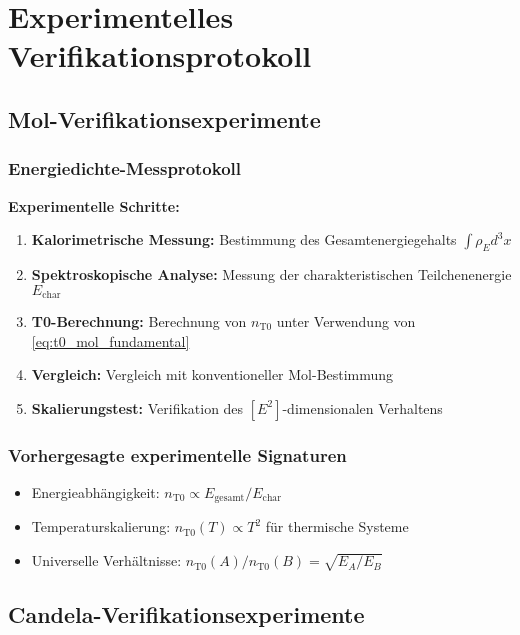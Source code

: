 \documentclass[12pt,a4paper]{article}
\newcommand{\rhoE}{\rho_E}
\newcommand{\Echar}{E_{\text{char}}}
\begin{document}
	\section{Experimentelles Verifikationsprotokoll}
	\label{sec:experimentelles_verifikationsprotokoll}
	
	\subsection{Mol-Verifikationsexperimente}
	\label{subsec:mol_verifikation}
	
	\subsubsection{Energiedichte-Messprotokoll}
	\label{subsubsec:mol_energie_protokoll}
	
	\textbf{Experimentelle Schritte:}
	\begin{enumerate}
		\item \textbf{Kalorimetrische Messung:} Bestimmung des Gesamtenergiegehalts $\int \rhoE d^3x$
		\item \textbf{Spektroskopische Analyse:} Messung der charakteristischen Teilchenenergie $\Echar$
		\item \textbf{T0-Berechnung:} Berechnung von $n_{\text{T0}}$ unter Verwendung von \cref{eq:t0_mol_fundamental}
		\item \textbf{Vergleich:} Vergleich mit konventioneller Mol-Bestimmung
		\item \textbf{Skalierungstest:} Verifikation des $[E^2]$-dimensionalen Verhaltens
	\end{enumerate}
	
	\subsubsection{Vorhergesagte experimentelle Signaturen}
	\label{subsubsec:mol_experimentelle_signaturen}
	
	\begin{itemize}
		\item Energieabhängigkeit: $n_{\text{T0}} \propto E_{\text{gesamt}}/\Echar$
		\item Temperaturskalierung: $n_{\text{T0}}(T) \propto T^2$ für thermische Systeme
		\item Universelle Verhältnisse: $n_{\text{T0}}(A)/n_{\text{T0}}(B) = \sqrt{E_A/E_B}$
	\end{itemize}
	
	\subsection{Candela-Verifikationsexperimente}
	\label{subsec:candela_verifikation}
	
\end{document}
